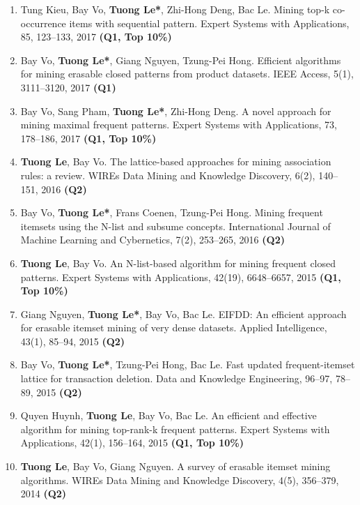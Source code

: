 \documentclass[letterpaper]{article}
\begin{document}
\begin{enumerate}
\item Tung Kieu, Bay Vo, \textbf{Tuong Le*}, Zhi-Hong Deng, Bac Le. Mining top-k co-occurrence items with sequential pattern. Expert Systems with Applications, 85, 123--133, 2017 \textbf{(Q1, Top 10\%)}

\item Bay Vo, \textbf{Tuong Le*}, Giang Nguyen, Tzung-Pei Hong. Efficient algorithms for mining erasable closed patterns from product datasets. IEEE Access, 5(1), 3111--3120, 2017 \textbf{(Q1)}

\item Bay Vo, Sang Pham, \textbf{Tuong Le*}, Zhi-Hong Deng. A novel approach for mining maximal frequent patterns. Expert Systems with Applications, 73, 178--186, 2017 \textbf{(Q1, Top 10\%)}

\item \textbf{Tuong Le}, Bay Vo. The lattice-based approaches for mining association rules: a review. WIREs Data Mining and Knowledge Discovery, 6(2), 140--151, 2016 \textbf{(Q2)}

\item Bay Vo, \textbf{Tuong Le*}, Frans Coenen, Tzung-Pei Hong. Mining frequent itemsets using the N-list and subsume concepts. International Journal of Machine Learning and Cybernetics, 7(2), 253--265, 2016 \textbf{(Q2)}

\item \textbf{Tuong Le}, Bay Vo. An N-list-based algorithm for mining frequent closed patterns. Expert Systems with Applications, 42(19), 6648--6657, 2015 \textbf{(Q1, Top 10\%)}

\item Giang Nguyen, \textbf{Tuong Le*}, Bay Vo, Bac Le. EIFDD: An efficient approach for erasable itemset mining of very dense datasets. Applied Intelligence, 43(1), 85--94, 2015 \textbf{(Q2)} 

\item Bay Vo, \textbf{Tuong Le*}, Tzung-Pei Hong, Bac Le. Fast updated frequent-itemset lattice for transaction deletion. Data and Knowledge Engineering, 96–97, 78--89, 2015 \textbf{(Q2)}

\item Quyen Huynh, \textbf{Tuong Le}, Bay Vo, Bac Le. An efficient and effective algorithm for mining top-rank-k frequent patterns. Expert Systems with Applications, 42(1), 156--164, 2015 \textbf{(Q1, Top 10\%)}

\item \textbf{Tuong Le}, Bay Vo, Giang Nguyen. A survey of erasable itemset mining algorithms. WIREs Data Mining and Knowledge Discovery, 4(5), 356--379, 2014 \textbf{(Q2)}


\end{enumerate}
\end{document}
